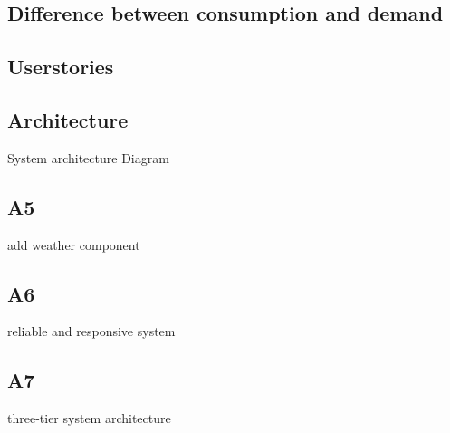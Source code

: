 \documentclass[12pt]{scrartcl}
\begin{document}
\subsection{Difference between consumption and demand}\label{sec:diffconsumptiondemand}

\subsection{Userstories}\label{sec:userstories}


\subsection{Architecture}
System architecture Diagram

\subsection*{A5}
add weather component

\subsection*{A6}
reliable and responsive system

\subsection*{A7}
three-tier system architecture

\end{document}
